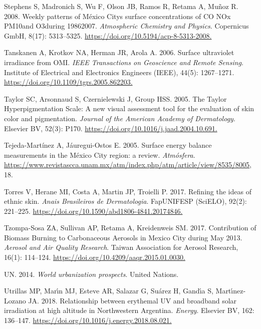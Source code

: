 \documentclass[10pt]{article}
\begin{document}
\label{csl:68}Stephens S, Madronich S, Wu F, Olson JB, Ramos R, Retama A, Mu{\~{n}}oz R. 2008. {Weekly patterns of M{\'{e}}xico City{\textquotesingle}s surface concentrations of {CO} {NOx} {PM}10and O3during 1986{\textendash}2007}. \textit{Atmospheric Chemistry and Physics}. Copernicus {GmbH}, 8(17): 5313–5325. \url{https://doi.org/10.5194/acp-8-5313-2008.}

\label{csl:27}Tanskanen A, Krotkov NA, Herman JR, Arola A. 2006. {Surface ultraviolet irradiance from {OMI}}. \textit{{IEEE} Transactions on Geoscience and Remote Sensing}. Institute of Electrical and Electronics Engineers ({IEEE}), 44(5): 1267–1271. \url{https://doi.org/10.1109/tgrs.2005.862203.}

\label{csl:42}Taylor SC, Arsonnaud S, Czernielewski J, Group HSS. 2005. {The Taylor Hyperpigmentation Scale: A new visual assessment tool for the evaluation of skin color and pigmentation}. \textit{Journal of the American Academy of Dermatology}. Elsevier {BV}, 52(3): P170. \url{https://doi.org/10.1016/j.jaad.2004.10.691.}

\label{csl:7}Tejeda-Martínez A, Jáuregui-Ostos E. 2005. {Surface energy balance measurements in the México City region: a review}. \textit{Atmósfera}. \url{https://www.revistascca.unam.mx/atm/index.php/atm/article/view/8535/8005,} 18.

\label{csl:49}Torres V, Herane MI, Costa A, Martin JP, Troielli P. 2017. {Refining the ideas of ethnic skin}. \textit{Anais Brasileiros de Dermatologia}. {FapUNIFESP} ({SciELO}), 92(2): 221–225. \url{https://doi.org/10.1590/abd1806-4841.20174846.}

\label{csl:5}Tzompa-Sosa ZA, Sullivan AP, Retama A, Kreidenweis SM. 2017. {Contribution of Biomass Burning to Carbonaceous Aerosols in Mexico City during May 2013}. \textit{Aerosol and Air Quality Research}. Taiwan Association for Aerosol Research, 16(1): 114–124. \url{https://doi.org/10.4209/aaqr.2015.01.0030.}

\label{csl:1}UN. 2014. \textit{{World urbanization prospects}}. United Nations.

\label{csl:60}Utrillas MP, Mar{\'{\i}}n MJ, Esteve AR, Salazar G, Su{\'{a}}rez H, Gand{\'{\i}}a S, Mart{\'{\i}}nez-Lozano JA. 2018. {Relationship between erythemal {UV} and broadband solar irradiation at high altitude in Northwestern Argentina}. \textit{Energy}. Elsevier {BV}, 162: 136–147. \url{https://doi.org/10.1016/j.energy.2018.08.021.}
\end{document}
